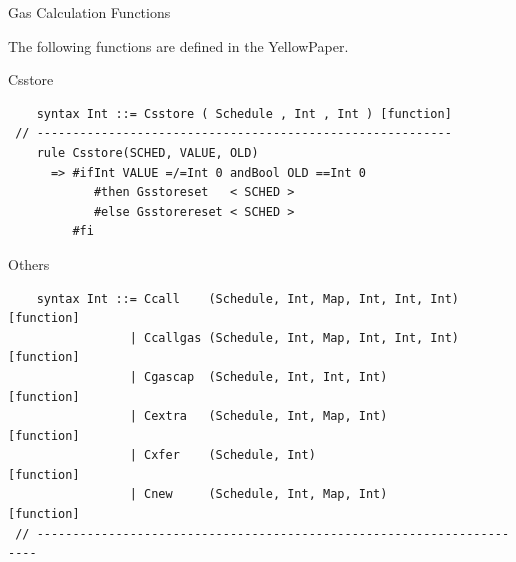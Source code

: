 \documentclass[8pt,ignorenonframetext,]{beamer}
\begin{document}
\begin{frame}[fragile]{Gas Calculation Functions}

The following functions are defined in the YellowPaper.

\begin{block}{Csstore}

\begin{verbatim}
    syntax Int ::= Csstore ( Schedule , Int , Int ) [function]
 // ----------------------------------------------------------
    rule Csstore(SCHED, VALUE, OLD)
      => #ifInt VALUE =/=Int 0 andBool OLD ==Int 0
            #then Gsstoreset   < SCHED >
            #else Gsstorereset < SCHED >
         #fi
\end{verbatim}

\pause

\end{block}

\begin{block}{Others}

\begin{verbatim}
    syntax Int ::= Ccall    (Schedule, Int, Map, Int, Int, Int) [function]
                 | Ccallgas (Schedule, Int, Map, Int, Int, Int) [function]
                 | Cgascap  (Schedule, Int, Int, Int)           [function]
                 | Cextra   (Schedule, Int, Map, Int)           [function]
                 | Cxfer    (Schedule, Int)                     [function]
                 | Cnew     (Schedule, Int, Map, Int)           [function]
 // ----------------------------------------------------------------------
\end{verbatim}

\end{block}

\end{frame}
\end{document}
